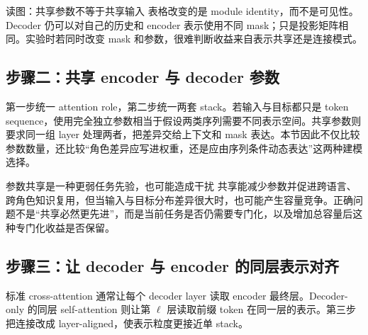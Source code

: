 
\begin{knowledgebox}{读图：共享参数不等于共享输入}
表格改变的是 module identity，而不是可见性。Decoder 仍可以对自己的历史和 encoder 表示使用不同 mask；只是投影矩阵相同。实验时若同时改变 mask 和参数，很难判断收益来自表示共享还是连接模式。
\end{knowledgebox}

\subsection{步骤二：共享 encoder 与 decoder 参数}

第一步统一 attention role，第二步统一两套 stack。若输入与目标都只是 token sequence，使用完全独立参数相当于假设两类序列需要不同表示空间。共享参数则要求同一组 layer 处理两者，把差异交给上下文和 mask 表达。本节因此不仅比较参数数量，还比较“角色差异应写进权重，还是应由序列条件动态表达”这两种建模选择。



\begin{warningbox}{参数共享是一种更弱任务先验，也可能造成干扰}
共享能减少参数并促进跨语言、跨角色知识复用，但当输入与目标分布差异很大时，也可能产生容量竞争。正确问题不是“共享必然更先进”，而是当前任务是否仍需要专门化，以及增加总容量后这种专门化收益是否保留。
\end{warningbox}


\subsection{步骤三：让 decoder 与 encoder 的同层表示对齐}

标准 cross-attention 通常让每个 decoder layer 读取 encoder 最终层。Decoder-only 的同层 self-attention 则让第 $\ell$ 层读取前缀 token 在同一层的表示。第三步把连接改成 layer-aligned，使表示粒度更接近单 stack。

